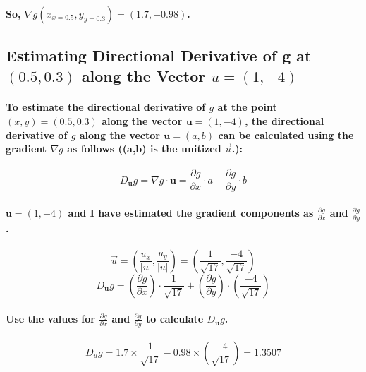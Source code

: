 \paragraph{So, $\nabla g(x_{x=0.5},y_{y=0.3})=(1.7,-0.98)$.}
% 
% 
% 
% 
\subsection{Estimating Directional Derivative of g at $(0.5, 0.3)$ along the Vector $u=(1,-4)$}
% 
% 
% 
% 
\paragraph{To estimate the directional derivative of \(g\) at the point \((x, y) = (0.5, 0.3)\) along the vector \(\mathbf{u} = (1, -4)\), the directional derivative of \(g\) along the vector \(\mathbf{u} = (a, b)\) can be calculated using the gradient \(\nabla g\) as follows ((a,b) is the unitized $\vec{u}$.):}

\begin{equation}
    D_{\mathbf{u}} g = \nabla g \cdot \mathbf{u} = \frac{\partial g}{\partial x} \cdot a + \frac{\partial g}{\partial y} \cdot b
\end{equation}

\paragraph{\(\mathbf{u} = (1, -4)\) and I have estimated the gradient components as \(\frac{\partial g}{\partial x}\) and \(\frac{\partial g}{\partial y}\).}
% 
% 
% 
%     
$$ \vec{u}=(\frac{u_x}{|u|},\frac{u_y}{|u|})=(\frac{1}{\sqrt{17}},\frac{-4}{\sqrt{17}}) $$
% 
% 
% 
$$ D_{\mathbf{u}} g = \left(\frac{\partial g}{\partial x}\right) \cdot \frac{1}{\sqrt{17}} + \left(\frac{\partial g}{\partial y}\right) \cdot (\frac{-4}{\sqrt{17}}) $$

\paragraph{Use the values for \(\frac{\partial g}{\partial x}\) and \(\frac{\partial g}{\partial y}\) to calculate \(D_{\mathbf{u}} g\).}
% 
% 
% 
$$ D_u g = 1.7 \times \frac{1}{\sqrt{17}} - 0.98 \times (\frac{-4}{\sqrt{17}}) = 1.3507 $$
% 
% 
% 
% 
% 
% 
% 
% 
